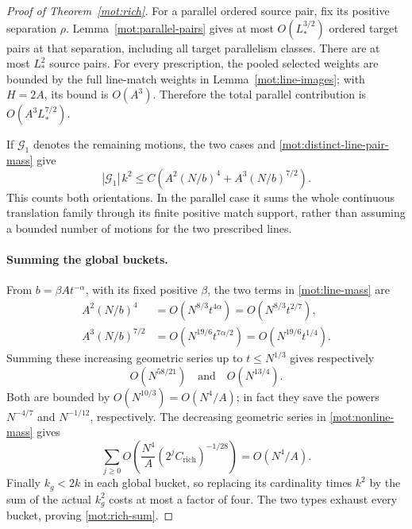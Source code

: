 \begin{proof}[Proof of Theorem~\ref{mot:rich}]
For a parallel ordered source pair, fix its positive separation
\(\rho\).  Lemma~\ref{mot:parallel-pairs} gives at most
\(O(L_*^{3/2})\) ordered target pairs at that separation, including
all target parallelism classes.  There are at most \(L_*^2\)
source pairs.  For every prescription, the pooled selected weights
are bounded by the full line-match weights in
Lemma~\ref{mot:line-images}; with \(H=2A\), its bound is
\(O(A^3)\).  Therefore the total parallel contribution is
\(O(A^3L_*^{7/2})\).

If \(\mathcal G_1\) denotes the remaining motions, the two cases
and \eqref{mot:distinct-line-pair-mass} give
\begin{equation}
\label{mot:line-mass}
 |\mathcal G_1|\,k^2
 \le C\left(A^2(N/b)^4+A^3(N/b)^{7/2}\right).
\end{equation}
This counts both orientations.  In the parallel case it sums the
whole continuous translation family through its finite positive
match support, rather than assuming a bounded number of motions
for the two prescribed lines.

\paragraph{Summing the global buckets.}
From \(b=\beta A t^{-\alpha}\), with its fixed positive
\(\beta\), the two terms in \eqref{mot:line-mass} are
\begin{align}
\label{mot:nonparallel-exponent}
 A^2(N/b)^4&=O\left(N^{8/3}t^{4\alpha}\right)
             =O\left(N^{8/3}t^{2/7}\right),\\
\label{mot:parallel-exponent}
 A^3(N/b)^{7/2}&=O\left(N^{19/6}t^{7\alpha/2}\right)
             =O\left(N^{19/6}t^{1/4}\right).
\end{align}
Summing these increasing geometric series up to
\(t\le N^{1/3}\) gives respectively
\[
 O\left(N^{58/21}\right)
 \quad\text{and}\quad
 O\left(N^{13/4}\right).
\]
Both are bounded by \(O(N^{10/3})=O(N^4/A)\); in fact they save
the powers \(N^{-4/7}\) and \(N^{-1/12}\), respectively.
The decreasing geometric series in
\eqref{mot:nonline-mass} gives
\[
 \sum_{j\ge0}
 O\left(\frac{N^4}{A}
       (2^jC_{\mathrm{rich}})^{-1/28}\right)
 =O(N^4/A).
\]
Finally \(k_g<2k\) in each global bucket, so replacing its
cardinality times \(k^2\) by the sum of the actual \(k_g^2\)
costs at most a factor of four.  The two types exhaust every
bucket, proving \eqref{mot:rich-sum}.
\end{proof}

